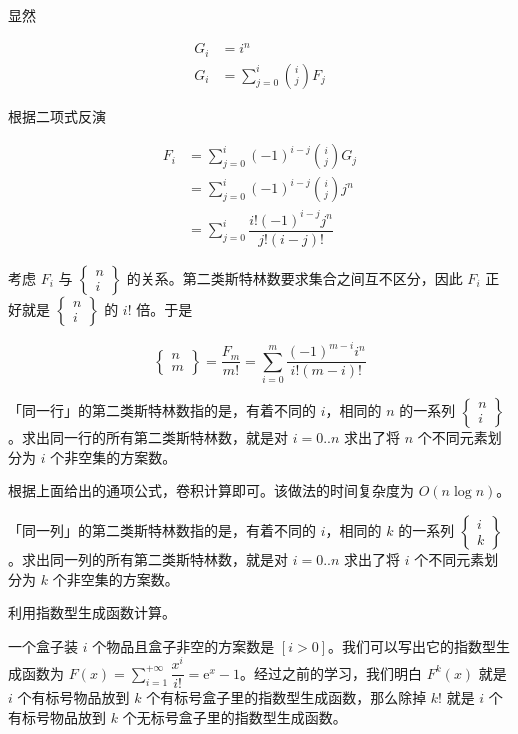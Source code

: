显然

$$
\begin{aligned}
G_i&=i^n\\
G_i&=\sum\limits_{j=0}^i\binom{i}{j}F_j
\end{aligned}
$$

根据二项式反演

$$
\begin{aligned}
F_i&=\sum\limits_{j=0}^{i}(-1)^{i-j}\binom{i}{j}G_j\\
&=\sum\limits_{j=0}^{i}(-1)^{i-j}\binom{i}{j}j^n\\
&=\sum\limits_{j=0}^{i}\dfrac{i!(-1)^{i-j}j^n}{j!(i-j)!}
\end{aligned}
$$

考虑 $F_i$ 与 $\begin{Bmatrix}n\\i\end{Bmatrix}$ 的关系。第二类斯特林数要求集合之间互不区分，因此 $F_i$ 正好就是 $\begin{Bmatrix}n\\i\end{Bmatrix}$ 的 $i!$ 倍。于是

$$
\begin{Bmatrix}n\\m\end{Bmatrix}=\dfrac{F_m}{m!}=\sum\limits_{i=0}^m\dfrac{(-1)^{m-i}i^n}{i!(m-i)!}
$$


「同一行」的第二类斯特林数指的是，有着不同的 $i$，相同的 $n$ 的一系列 $\begin{Bmatrix}n\\i\end{Bmatrix}$。求出同一行的所有第二类斯特林数，就是对 $i=0..n$ 求出了将 $n$ 个不同元素划分为 $i$ 个非空集的方案数。

根据上面给出的通项公式，卷积计算即可。该做法的时间复杂度为 $O(n \log n)$。


「同一列」的第二类斯特林数指的是，有着不同的 $i$，相同的 $k$ 的一系列 $\begin{Bmatrix}i\\k\end{Bmatrix}$。求出同一列的所有第二类斯特林数，就是对 $i=0..n$ 求出了将 $i$ 个不同元素划分为 $k$ 个非空集的方案数。

利用指数型生成函数计算。

一个盒子装 $i$ 个物品且盒子非空的方案数是 $[i>0]$。我们可以写出它的指数型生成函数为 $F(x)=\sum\limits_{i=1}^{+\infty}\dfrac{x^i}{i!} = \mathrm{e}^x-1$。经过之前的学习，我们明白 $F^k(x)$ 就是 $i$ 个有标号物品放到 $k$ 个有标号盒子里的指数型生成函数，那么除掉 $k!$ 就是 $i$ 个有标号物品放到 $k$ 个无标号盒子里的指数型生成函数。

